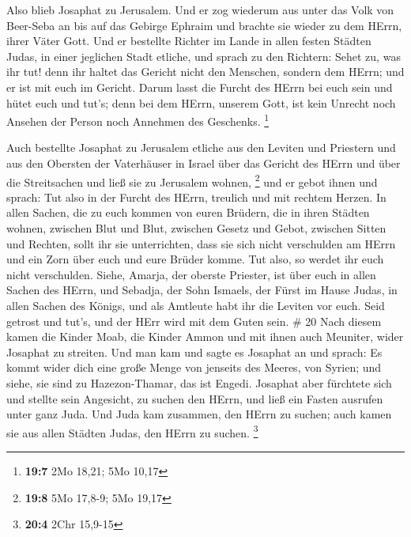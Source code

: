  Also blieb Josaphat zu Jerusalem. Und er zog wiederum aus
unter das Volk von Beer-Seba an bis auf das Gebirge Ephraim und brachte
sie wieder zu dem HErrn, ihrer Väter Gott.  Und er bestellte
Richter im Lande in allen festen Städten Judas, in einer jeglichen Stadt
etliche,  und sprach zu den Richtern: Sehet zu, was ihr tut!
denn ihr haltet das Gericht nicht den Menschen, sondern dem HErrn; und
er ist mit euch im Gericht.  Darum lasst die Furcht des
HErrn bei euch sein und hütet euch und tut's; denn bei dem HErrn,
unserem Gott, ist kein Unrecht noch Ansehen der Person noch Annehmen des
Geschenks. \footnote{\textbf{19:7} 2Mo 18,21; 5Mo 10,17}

 Auch bestellte Josaphat zu Jerusalem etliche aus den
Leviten und Priestern und aus den Obersten der Vaterhäuser in Israel
über das Gericht des HErrn und über die Streitsachen und ließ sie zu
Jerusalem wohnen, \footnote{\textbf{19:8} 5Mo 17,8-9; 5Mo 19,17}
 und er gebot ihnen und sprach: Tut also in der Furcht des
HErrn, treulich und mit rechtem Herzen.  In allen Sachen,
die zu euch kommen von euren Brüdern, die in ihren Städten wohnen,
zwischen Blut und Blut, zwischen Gesetz und Gebot, zwischen Sitten und
Rechten, sollt ihr sie unterrichten, dass sie sich nicht verschulden am
HErrn und ein Zorn über euch und eure Brüder komme. Tut also, so werdet
ihr euch nicht verschulden.  Siehe, Amarja, der oberste
Priester, ist über euch in allen Sachen des HErrn, und Sebadja, der Sohn
Ismaels, der Fürst im Hause Judas, in allen Sachen des Königs, und als
Amtleute habt ihr die Leviten vor euch. Seid getrost und tut's, und der
HErr wird mit dem Guten sein. \# 20  Nach diesem kamen die
Kinder Moab, die Kinder Ammon und mit ihnen auch Meuniter, wider
Josaphat zu streiten.  Und man kam und sagte es Josaphat an
und sprach: Es kommt wider dich eine große Menge von jenseits des
Meeres, von Syrien; und siehe, sie sind zu Hazezon-Thamar, das ist
Engedi.  Josaphat aber fürchtete sich und stellte sein
Angesicht, zu suchen den HErrn, und ließ ein Fasten ausrufen unter ganz
Juda.  Und Juda kam zusammen, den HErrn zu suchen; auch
kamen sie aus allen Städten Judas, den HErrn zu suchen. \footnote{\textbf{20:4}
  2Chr 15,9-15}

